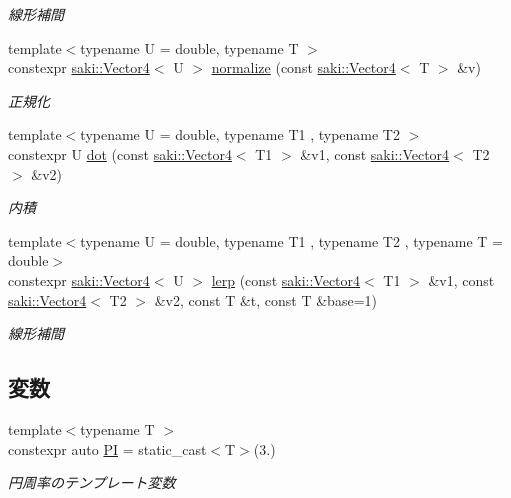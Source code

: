 \begin{DoxyCompactItemize}
\begin{DoxyCompactList}\small\item\em 線形補間 \end{DoxyCompactList}\item 
{\footnotesize template$<$typename U  = double, typename T $>$ }\\constexpr \mbox{\hyperlink{classsaki_1_1_vector4}{saki\+::\+Vector4}}$<$ U $>$ \mbox{\hyperlink{namespacesaki_a7ae70098357de6ff61013f230b7a7750}{normalize}} (const \mbox{\hyperlink{classsaki_1_1_vector4}{saki\+::\+Vector4}}$<$ T $>$ \&v)
\begin{DoxyCompactList}\small\item\em 正規化 \end{DoxyCompactList}\item 
{\footnotesize template$<$typename U  = double, typename T1 , typename T2 $>$ }\\constexpr U \mbox{\hyperlink{namespacesaki_a6ed2a14726e1df49115a45e829f2d9a2}{dot}} (const \mbox{\hyperlink{classsaki_1_1_vector4}{saki\+::\+Vector4}}$<$ T1 $>$ \&v1, const \mbox{\hyperlink{classsaki_1_1_vector4}{saki\+::\+Vector4}}$<$ T2 $>$ \&v2)
\begin{DoxyCompactList}\small\item\em 内積 \end{DoxyCompactList}\item 
{\footnotesize template$<$typename U  = double, typename T1 , typename T2 , typename T  = double$>$ }\\constexpr \mbox{\hyperlink{classsaki_1_1_vector4}{saki\+::\+Vector4}}$<$ U $>$ \mbox{\hyperlink{namespacesaki_a2e19b53c0e5aea77a9ba2cf5142f2b5e}{lerp}} (const \mbox{\hyperlink{classsaki_1_1_vector4}{saki\+::\+Vector4}}$<$ T1 $>$ \&v1, const \mbox{\hyperlink{classsaki_1_1_vector4}{saki\+::\+Vector4}}$<$ T2 $>$ \&v2, const T \&t, const T \&base=1)
\begin{DoxyCompactList}\small\item\em 線形補間 \end{DoxyCompactList}\end{DoxyCompactItemize}
\subsection*{変数}
\begin{DoxyCompactItemize}
\item 
{\footnotesize template$<$typename T $>$ }\\constexpr auto \mbox{\hyperlink{namespacesaki_a1e4c737224df004cb65f178577838f0c}{PI}} = static\+\_\+cast$<$T$>$(3.)
\begin{DoxyCompactList}\small\item\em 円周率のテンプレート変数 \end{DoxyCompactList}\end{DoxyCompactItemize}


